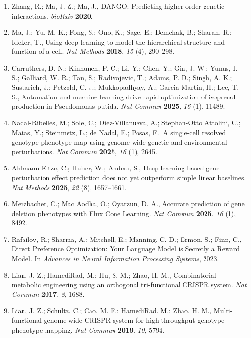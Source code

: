 \begin{enumerate}
    Alexandrov, T.; AlQuraishi, M.; Brennan, P.; Burkhardt, D. B.; Califano, A.;
    Cool, J.; Dernburg, A. F.; Ewing, K.; Fox, E. B.; Haury, M.; Herr, A. E.;
    Horvitz, E.; Hsu, P. D.; Jain, V.; Johnson, G. R.; Kalil, T.; Kelley, D. R.;
    Kelley, S. O.; Kreshuk, A.; Mitchison, T.; Otte, S.; Shendure, J.; Sofroniew,
    N. J.; Theis, F.; Theodoris, C. V.; Upadhyayula, S.; Valer, M.; Wang, B.; Xing,
    E.; Yeung-Levy, S.; Zitnik, M.; Karaletsos, T.; Regev, A.; Lundberg, E.;
    Leskovec, J.; Quake, S. R., How to build the virtual cell with artificial
    intelligence: Priorities and opportunities. \emph{Cell} \textbf{2024},
    \emph{187} (25), 7045--7063.
  \item Zhang, R.; Ma, J. Z.; Ma, J., DANGO: Predicting higher-order genetic
    interactions. \emph{bioRxiv} \textbf{2020}.
  \item Ma, J.; Yu, M. K.; Fong, S.; Ono, K.; Sage, E.; Demchak, B.; Sharan, R.;
    Ideker, T., Using deep learning to model the hierarchical structure and function
    of a cell. \emph{Nat Methods} \textbf{2018}, \emph{15} (4), 290--298.
  \item Carruthers, D. N.; Kinnunen, P. C.; Li, Y.; Chen, Y.; Gin, J. W.; Yunus, I.
    S.; Galliard, W. R.; Tan, S.; Radivojevic, T.; Adams, P. D.; Singh, A. K.;
    Sustarich, J.; Petzold, C. J.; Mukhopadhyay, A.; Garcia Martin, H.; Lee, T. S.,
    Automation and machine learning drive rapid optimization of isoprenol production
    in Pseudomonas putida. \emph{Nat Commun} \textbf{2025}, \emph{16} (1), 11489.
  \item Nadal-Ribelles, M.; Sole, C.; Diez-Villanueva, A.; Stephan-Otto Attolini,
    C.; Matas, Y.; Steinmetz, L.; de Nadal, E.; Posas, F., A single-cell resolved
    genotype-phenotype map using genome-wide genetic and environmental
    perturbations. \emph{Nat Commun} \textbf{2025}, \emph{16} (1), 2645.
  \item Ahlmann-Eltze, C.; Huber, W.; Anders, S., Deep-learning-based gene
    perturbation effect prediction does not yet outperform simple linear baselines.
    \emph{Nat Methods} \textbf{2025}, \emph{22} (8), 1657--1661.
  \item Merzbacher, C.; Mac Aodha, O.; Oyarzun, D. A., Accurate prediction of gene
    deletion phenotypes with Flux Cone Learning. \emph{Nat Commun} \textbf{2025},
    \emph{16} (1), 8492.
  \item Rafailov, R.; Sharma, A.; Mitchell, E.; Manning, C. D.; Ermon, S.; Finn,
    C., Direct Preference Optimization: Your Language Model is Secretly a Reward
    Model. In \emph{Advances in Neural Information Processing Systems}, 2023.
  \item Lian, J. Z.; HamediRad, M.; Hu, S. M.; Zhao, H. M., Combinatorial metabolic
    engineering using an orthogonal tri-functional CRISPR system. \emph{Nat Commun}
    \textbf{2017}, \emph{8}, 1688.
  \item Lian, J. Z.; Schultz, C.; Cao, M. F.; HamediRad, M.; Zhao, H. M.,
    Multi-functional genome-wide CRISPR system for high throughput
    genotype-phenotype mapping. \emph{Nat Commun} \textbf{2019}, \emph{10}, 5794.
\end{enumerate}
